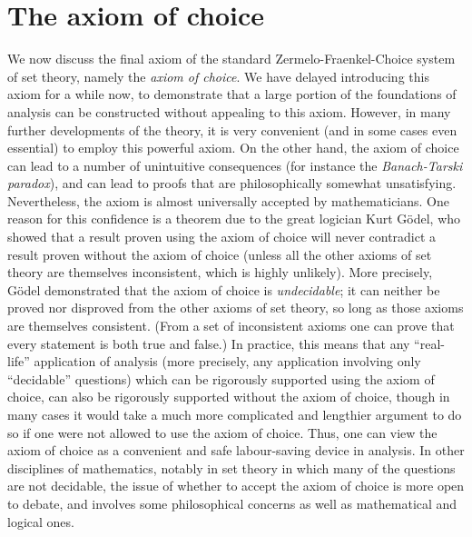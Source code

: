 \section{The axiom of choice}\label{i:sec:8.4}

\begin{note}
  We now discuss the final axiom of the standard Zermelo-Fraenkel-Choice system of set theory, namely the \emph{axiom of choice}.
  We have delayed introducing this axiom for a while now, to demonstrate that a large portion of the foundations of analysis can be constructed without appealing to this axiom.
  However, in many further developments of the theory, it is very convenient (and in some cases even essential) to employ this powerful axiom.
  On the other hand, the axiom of choice can lead to a number of unintuitive consequences (for instance the \emph{Banach-Tarski paradox}), and can lead to proofs that are philosophically somewhat unsatisfying.
  Nevertheless, the axiom is almost universally accepted by mathematicians.
  One reason for this confidence is a theorem due to the great logician Kurt Gödel, who showed that a result proven using the axiom of choice will never contradict a result proven without the axiom of choice
  (unless all the other axioms of set theory are themselves inconsistent, which is highly unlikely).
  More precisely, Gödel demonstrated that the axiom of choice is \emph{undecidable};
  it can neither be proved nor disproved from the other axioms of set theory, so long as those axioms are themselves consistent.
  (From a set of inconsistent axioms one can prove that every statement is both true and false.)
  In practice, this means that any ``real-life'' application of analysis
  (more precisely, any application involving only ``decidable'' questions)
  which can be rigorously supported using the axiom of choice, can also be rigorously supported without the axiom of choice, though in many cases it would take a much more complicated and lengthier argument to do so if one were not allowed to use the axiom of choice.
  Thus, one can view the axiom of choice as a convenient and safe labour-saving device in analysis.
  In other disciplines of mathematics, notably in set theory in which many of the questions are not decidable, the issue of whether to accept the axiom of choice is more open to debate, and involves some philosophical concerns as well as mathematical and logical ones.
\end{note}


